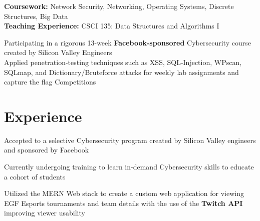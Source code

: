 \documentclass[a4paper]{Resume}
\begin{document}
\begin{onehalfspace}


\pt \textbf{Coursework:} Network Security, Networking, Operating Systems, Discrete Structures, Big Data   \\
\pt \textbf{Teaching Experience:} CSCI 135: Data Structures and Algorithms I  
\sectionsep


\pt Participating in a rigorous 13-week \textbf{Facebook-sponsored} Cybersecurity course created by Silicon Valley Engineers  \\
\pt Applied penetration-testing techniques such as XSS, SQL-Injection, WPscan, SQLmap, and Dictionary/Bruteforce attacks for weekly lab assignments and capture the flag Competitions
\sectionsep



\sectionsep


\section{Experience} 
\hrulefill 

\pt Accepted to a selective Cybersecurity program created by Silicon Valley engineers and sponsored by Facebook 

\pt Currently undergoing training to learn in-demand Cybersecurity skills to educate a cohort of students 

\sectionsep


\pt Utilized the MERN Web stack to create a custom web application for viewing EGF Esports tournaments and team details with the use of the \textbf{Twitch API} improving viewer usability \\


\end{onehalfspace}
\end{document}
